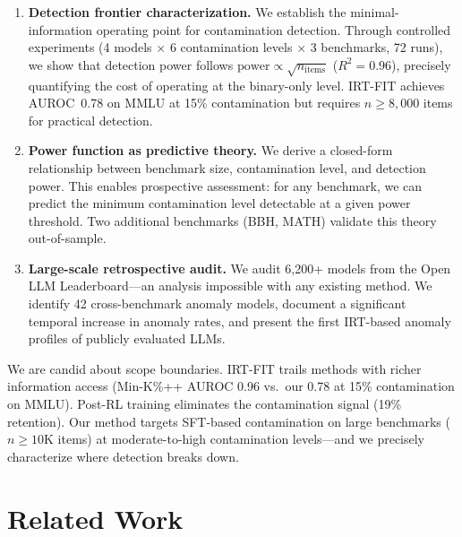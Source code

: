 \documentclass[11pt,a4paper]{article}
\begin{document}
\begin{enumerate}[leftmargin=*,topsep=2pt,itemsep=1pt]
\item \textbf{Detection frontier characterization.} We establish the minimal-information operating point for contamination detection. Through controlled experiments (4 models $\times$ 6 contamination levels $\times$ 3 benchmarks, 72 runs), we show that detection power follows $\text{power} \propto \sqrt{n_{\text{items}}}$ ($R^2{=}0.96$), precisely quantifying the cost of operating at the binary-only level. IRT-FIT achieves AUROC~0.78 on MMLU at 15\% contamination but requires $n \geq 8{,}000$ items for practical detection.

\item \textbf{Power function as predictive theory.} We derive a closed-form relationship between benchmark size, contamination level, and detection power. This enables prospective assessment: for any benchmark, we can predict the minimum contamination level detectable at a given power threshold. Two additional benchmarks (BBH, MATH) validate this theory out-of-sample.

\item \textbf{Large-scale retrospective audit.} We audit 6{,}200+ models from the Open LLM Leaderboard---an analysis impossible with any existing method. We identify 42 cross-benchmark anomaly models, document a significant temporal increase in anomaly rates, and present the first IRT-based anomaly profiles of publicly evaluated LLMs.
\end{enumerate}

We are candid about scope boundaries. IRT-FIT trails methods with richer information access (Min-K\%++ AUROC 0.96 vs.\ our 0.78 at 15\% contamination on MMLU). Post-RL training eliminates the contamination signal (19\% retention). Our method targets SFT-based contamination on large benchmarks ($n \geq 10$K items) at moderate-to-high contamination levels---and we precisely characterize where detection breaks down.


\section{Related Work}
\label{sec:related}
\end{document}
